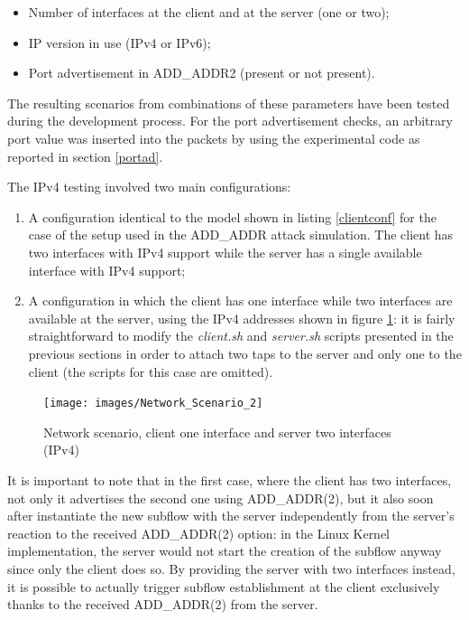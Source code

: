 \begin{itemize}
  \item Number of interfaces at the client and at the server (one or two);
  \item IP version in use (IPv4 or IPv6);
  \item Port advertisement in ADD\_ADDR2 (present or not present).
\end{itemize}

The resulting scenarios from combinations of these parameters have been tested during the development process. For the port advertisement checks, an arbitrary port value was inserted into the packets by using the experimental code as reported in section \ref{portad}.

The IPv4 testing involved two main configurations:
\begin{enumerate}
  \item A configuration identical to the model shown in listing \ref{clientconf} for the case of the setup used in the ADD\_ADDR attack simulation. The client has two interfaces with IPv4 support while the server has a single available interface with IPv4 support;
  \item  A configuration in which the client has one interface while two interfaces are available at the server, using the IPv4 addresses shown in figure \ref{fig:network2}: it is fairly straightforward to modify the \textit{client.sh} and \textit{server.sh} scripts presented in the previous sections in order to attach two taps to the server and only one to the client (the scripts for this case are omitted). 
\end{enumerate}

\begin{figure}[!htb]
\centering
\texttt{[image: images/Network\_Scenario\_2]}
\caption{Network scenario, client one interface and server two interfaces (IPv4)}
\label{fig:network2}
\end{figure} 

It is important to note that in the first case, where the client has two interfaces, not only it advertises the second one using ADD\_ADDR(2), but it also soon after instantiate the new subflow with the server independently from the server's reaction to the received ADD\_ADDR(2) option: in the Linux Kernel implementation, the server would not start the creation of the subflow anyway since only the client does so. By providing the server with two interfaces instead, it is possible to actually trigger subflow establishment at the client exclusively thanks to the received ADD\_ADDR(2) from the server. 

